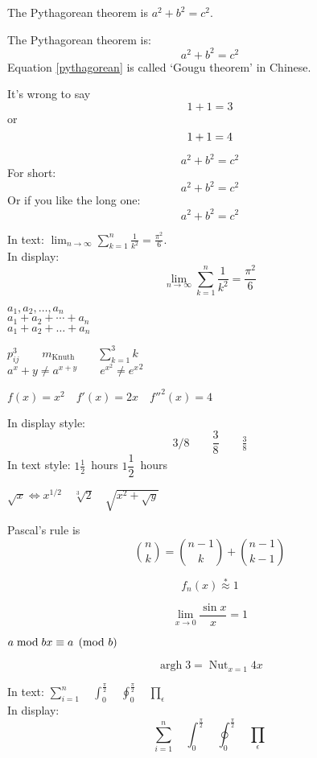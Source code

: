 \documentclass{article}
\DeclareMathOperator{\argh}{argh}
\DeclareMathOperator*{\nut}{Nut}
\theoremstyle{definition} \newtheorem{law}{Law}
\theoremstyle{plain} \newtheorem{jury}[law]{Jury}
\theoremstyle{remark} \newtheorem*{mar}{Margaret}
\begin{document}
The Pythagorean theorem is
$a^2 + b^2 = c^2$.

The Pythagorean theorem is:
\begin{equation}
a^2 + b^2 = c^2 \label{pythagorean} 
\end{equation}
Equation \eqref{pythagorean} is
called `Gougu theorem' in Chinese.

It's wrong to say
\begin{equation}
1 + 1 = 3 \tag{dumb}
\end{equation}
or
\begin{equation}
1 + 1 = 4 \notag
\end{equation}

\begin{equation*}
a^2 + b^2 = c^2
\end{equation*}
For short:
\[ a^2 + b^2 = c^2 \]
Or if you like the long one:
\begin{displaymath}
a^2 + b^2 = c^2
\end{displaymath}

In text:
$\lim_{n \to \infty}
\sum_{k=1}^n \frac{1}{k^2}
= \frac{\pi^2}{6}$.\\
In display:
\[
\lim_{n \to \infty}
\sum_{k=1}^n \frac{1}{k^2}
= \frac{\pi^2}{6}
\]

$a_1, a_2, \dots, a_n$ \\
$a_1 + a_2 + \cdots + a_n$ \\
$a_1 + a_2 + \dots + a_n$

$p^3_{ij} \qquad
m_\mathrm{Knuth}\qquad
\sum_{k=1}^3 k $\\[5pt]
$a^x+y \neq a^{x+y}\qquad
e^{x^2} \neq {e^x}^2$

$f(x) = x^2 \quad f'(x)
= 2x \quad f''^{2}(x) = 4$ 

In display style:
\[
3/8 \qquad \frac{3}{8}
\qquad \tfrac{3}{8}
\]
In text style:
$1\frac{1}{2}$~hours \qquad
$1\dfrac{1}{2}$~hours

$\sqrt{x} \Leftrightarrow x^{1/2}
\quad \sqrt[3]{2}
\quad \sqrt{x^{2} + \sqrt{y}}$

Pascal's rule is
\[
\binom{n}{k} =\binom{n-1}{k}
+ \binom{n-1}{k-1}
\]

\[
f_n(x) \stackrel{*}{\approx} 1
\]

\[
\lim_{x \rightarrow 0}
\frac{\sin x}{x}=1
\]

$a\bmod b \\
x\equiv a \pmod{b}$

\[\argh 3 = \nut_{x=1} 4x\]

In text:
$\sum_{i=1}^n \quad
\int_0^{\frac{\pi}{2}} \quad
\oint_0^{\frac{\pi}{2}} \quad
\prod_\epsilon $ \\
In display:
\[\sum_{i=1}^n \quad
\int_0^{\frac{\pi}{2}} \quad
\oint_0^{\frac{\pi}{2}} \quad
\prod_\epsilon \]
\end{document}
